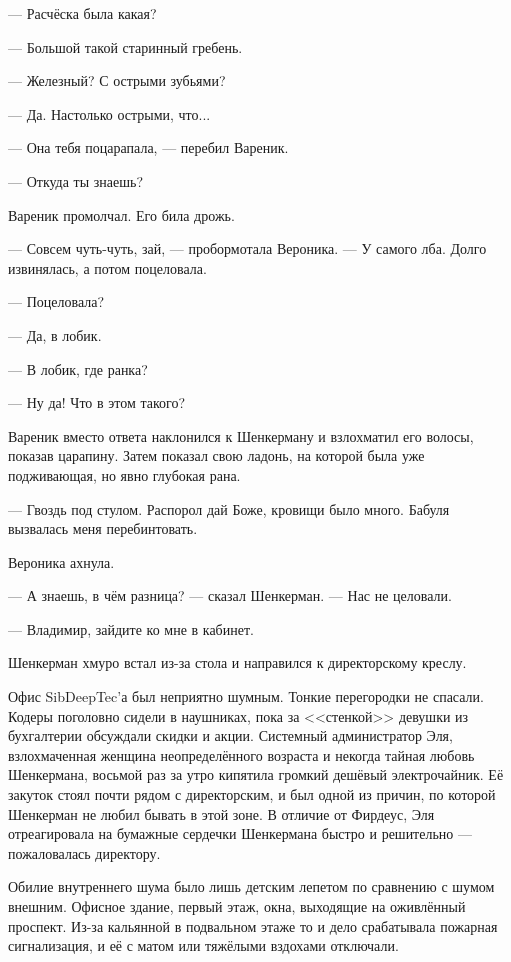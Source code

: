 --- Расчёска была какая?

--- Большой такой старинный гребень.

--- Железный?
С острыми зубьями?

--- Да.
Настолько острыми, что...

--- Она тебя поцарапала, --- перебил Вареник.

--- Откуда ты знаешь?

Вареник промолчал.
Его била дрожь.

--- Совсем чуть-чуть, зай, --- пробормотала Вероника.
--- У самого лба.
Долго извинялась, а потом поцеловала.

--- Поцеловала?

--- Да, в лобик.

--- В лобик, где ранка?

--- Ну да!
Что в этом такого?

Вареник вместо ответа наклонился к Шенкерману и взлохматил его волосы, показав царапину.
Затем показал свою ладонь, на которой была уже подживающая, но явно глубокая рана.

--- Гвоздь под стулом.
Распорол дай Боже, кровищи было много.
Бабуля вызвалась меня перебинтовать.

Вероника ахнула.

--- А знаешь, в чём разница? --- сказал Шенкерман.
--- Нас не целовали.

\asterism

--- Владимир, зайдите ко мне в кабинет.

Шенкерман хмуро встал из-за стола и направился к директорскому креслу.

Офис SibDeepTec'а был неприятно шумным.
Тонкие перегородки не спасали.
Кодеры поголовно сидели в наушниках, пока за <<стенкой>> девушки из бухгалтерии обсуждали скидки и акции.
Системный администратор Эля, взлохмаченная женщина неопределённого возраста и некогда тайная любовь Шенкермана, восьмой раз за утро кипятила громкий дешёвый электрочайник.
Её закуток стоял почти рядом с директорским, и был одной из причин, по которой Шенкерман не любил бывать в этой зоне.
В отличие от Фирдеус, Эля отреагировала на бумажные сердечки Шенкермана быстро и решительно --- пожаловалась директору.

Обилие внутреннего шума было лишь детским лепетом по сравнению с шумом внешним.
Офисное здание, первый этаж, окна, выходящие на оживлённый проспект.
Из-за кальянной в подвальном этаже то и дело срабатывала пожарная сигнализация, и её с матом или тяжёлыми вздохами отключали.

